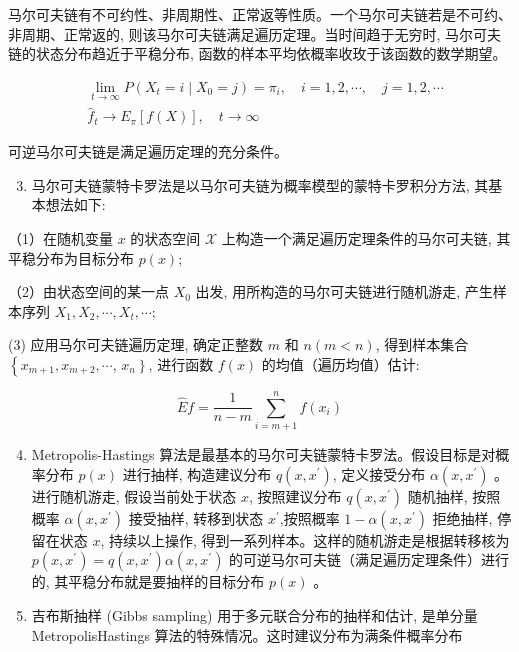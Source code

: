 \documentclass[10pt]{article}
\begin{document}
\begin{CJK*}{UTF8}{bsmi}
马尔可夫链有不可约性、非周期性、正常返等性质。一个马尔可夫链若是不可约、非周期、正常返的, 则该马尔可夫链满足遍历定理。当时间趋于无穷时, 马尔可夫链的状态分布趋近于平稳分布, 函数的样本平均依概率收玫于该函数的数学期望。

$$
\begin{aligned}
& \lim _{t \rightarrow \infty} P\left(X_{t}=i \mid X_{0}=j\right)=\pi_{i}, \quad i=1,2, \cdots, \quad j=1,2, \cdots \\
& \hat{f}_{t} \rightarrow E_{\pi}[f(X)], \quad t \rightarrow \infty
\end{aligned}
$$

可逆马尔可夫链是满足遍历定理的充分条件。

\begin{enumerate}
  \setcounter{enumi}{2}
  \item 马尔可夫链蒙特卡罗法是以马尔可夫链为概率模型的蒙特卡罗积分方法, 其基本想法如下:
\end{enumerate}

（1）在随机变量 $x$ 的状态空间 $\mathcal{X}$ 上构造一个满足遍历定理条件的马尔可夫链, 其平稳分布为目标分布 $p(x)$;

（2）由状态空间的某一点 $X_{0}$ 出发, 用所构造的马尔可夫链进行随机游走, 产生样本序列 $X_{1}, X_{2}, \cdots, X_{t}, \cdots$;

(3) 应用马尔可夫链遍历定理, 确定正整数 $m$ 和 $n(m<n)$, 得到样本集合 $\left\{x_{m+1}, x_{m+2}, \cdots\right.$, $\left.x_{n}\right\}$, 进行函数 $f(x)$ 的均值（遍历均值）估计:

$$
\hat{E} f=\frac{1}{n-m} \sum_{i=m+1}^{n} f\left(x_{i}\right)
$$

\begin{enumerate}
  \setcounter{enumi}{3}
  \item Metropolis-Hastings 算法是最基本的马尔可夫链蒙特卡罗法。假设目标是对概率分布 $p(x)$ 进行抽样, 构造建议分布 $q\left(x, x^{\prime}\right)$, 定义接受分布 $\alpha\left(x, x^{\prime}\right)$ 。进行随机游走, 假设当前处于状态 $x$, 按照建议分布 $q\left(x, x^{\prime}\right)$ 随机抽样, 按照概率 $\alpha\left(x, x^{\prime}\right)$ 接受抽样, 转移到状态 $x^{\prime}$,按照概率 $1-\alpha\left(x, x^{\prime}\right)$ 拒绝抽样, 停留在状态 $x$, 持续以上操作, 得到一系列样本。这样的随机游走是根据转移核为 $p\left(x, x^{\prime}\right)=q\left(x, x^{\prime}\right) \alpha\left(x, x^{\prime}\right)$ 的可逆马尔可夫链（满足遍历定理条件）进行的, 其平稳分布就是要抽样的目标分布 $p(x)$ 。

  \item 吉布斯抽样 (Gibbs sampling) 用于多元联合分布的抽样和估计, 是单分量 MetropolisHastings 算法的特殊情况。这时建议分布为满条件概率分布


\end{enumerate}
\end{CJK*}
\end{document}
